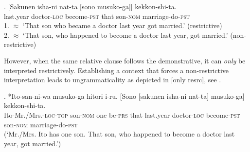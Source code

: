 \documentclass [output=book,colorlinks,citecolor=brown]{langscibook}
\begin{document}
\newpage

\exg. [Sakunen isha-ni nat-ta [sono musuko-ga]] kekkon-shi-ta.\\
last.year doctor-\textsc{loc} become-\textsc{pst} that son-\textsc{nom} marriage-do-\textsc{pst}\\
1. $\approx$ `That son who became a doctor last year got married.’ (restrictive) \\
2. $\approx$ `That son, who happened to become a doctor last year, got married.' (non-restrictive) \\ \null \hfill \citep[4, 5]{ishizuka:2008:RC} \label{resrc}

However, when the same relative clause follows the demonstrative, it can \textit{only} be interpreted restrictively. Establishing a context that forces a non-restrictive interpretation leads to ungrammaticality as depicted in \ref{only resrc}, see \citet{ishizuka:2008:RC}. %

\exg. *Ito-san-ni-wa musuko-ga hitori i-ru. [Sono [sakunen isha-ni nat-ta] musuko-ga] kekkon-shi-ta.\\
Ito-Mr./Mrs.-\textsc{loc-top} son-\textsc{nom} one be-\textsc{prs} that last.year doctor-\textsc{loc} become-\textsc{pst} son-\textsc{nom} marriage-do-\textsc{pst}\\
(`Mr./Mrs. Ito has one son. That son, who happened to become a doctor last year, got married.’) \\ \null \hfill \citep[5]{ishizuka:2008:RC} \label{only resrc}
\end{document}
